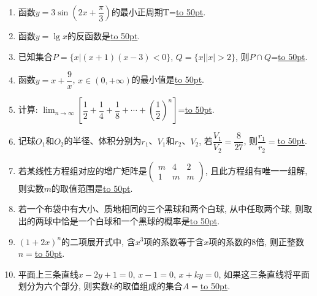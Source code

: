\documentclass[10pt,a4paper]{article}
\newcommand{\blank}[1]{\underline{\hbox to #1pt{}}}
\begin{document}
\begin{enumerate}[1.]
\item 函数$y=3\sin(2x+\dfrac{\pi}3)$的最小正周期T=\blank{50}.
\item 函数$y=\lg x$的反函数是\blank{50}.
\item 已知集合$P=\{x|(x+1)(x-3)<0\}$, $Q=\{x||x|>2\}$, 则$P\cap Q$=\blank{50}.
\item 函数$y=x+\dfrac9x$, $x\in (0,+\infty)$的最小值是\blank{50}.
\item 计算: $\displaystyle\lim_{n\to\infty}[\dfrac12+\dfrac14+\dfrac18+\cdots+(\dfrac12)^n]$=\blank{50}.
\item 记球$O_1$和$O_2$的半径、体积分别为$r_1$、$V_1$和$r_2$、$V_2$, 若$\dfrac{V_1}{V_2}=\dfrac8{27}$, 则$\dfrac{r_1}{r_2}=$\blank{50}.
\item 若某线性方程组对应的增广矩阵是$\begin{pmatrix} m & 4 & 2 \\ 1 & m & m \end{pmatrix}$, 且此方程组有唯一一组解, 则实数$m$的取值范围是\blank{50}.
\item 若一个布袋中有大小、质地相同的三个黑球和两个白球, 从中任取两个球, 则取出的两球中恰是一个白球和一个黑球的概率是\blank{50}.
\item $(1+2x)^n$的二项展开式中, 含$x^3$项的系数等于含$x$项的系数的$8$倍, 则正整数$n=$\blank{50}.
\item 平面上三条直线$x-2y+1=0$, $x-1=0$, $x+ky=0$, 如果这三条直线将平面划分为六个部分, 则实数$k$的取值组成的集合$A=$\blank{50}.



\end{enumerate}
\end{document}
